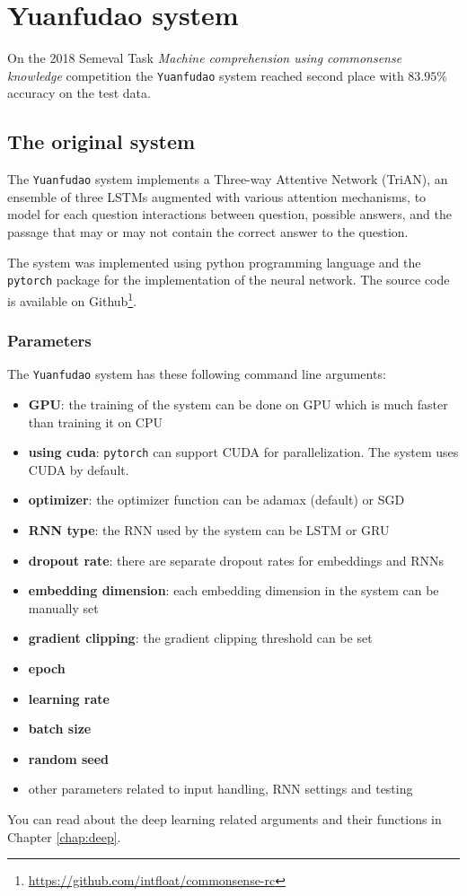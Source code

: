 \chapter{Yuanfudao system}
\label{chap:yuanfudao}
On the 2018 Semeval Task \textit{Machine comprehension using commonsense knowledge} competition the \texttt{Yuanfudao} \cite{Wang:2018} system reached second place with $83.95\%$ accuracy on the test data.

\section{The original system}

The \texttt{Yuanfudao} system implements a Three-way Attentive Network (TriAN), an ensemble of three LSTMs augmented with various attention mechanisms, to model for each question interactions between question, possible answers, and the passage that may or may not contain the correct answer to the question.

The system was implemented using python programming language and the \texttt{pytorch} package for the implementation of the neural network. The source code is available on Github\footnote{\url{https://github.com/intfloat/commonsense-rc}}.

\subsection{Parameters}

The \texttt{Yuanfudao} system has these following command line arguments:
\begin{itemize}
	\item \textbf{GPU}: the training of the system can be done on GPU which is much faster than training it on CPU
	\item \textbf{using cuda}: \texttt{pytorch} can support CUDA for parallelization. The system uses CUDA by default.
	\item \textbf{optimizer}: the optimizer function can be adamax (default) or SGD
	\item \textbf{RNN type}: the RNN used by the system can be LSTM or GRU
	\item \textbf{dropout rate}: there are separate dropout rates for embeddings and RNNs
	\item \textbf{embedding dimension}: each embedding dimension in the system can be manually set
	\item \textbf{gradient clipping}: the gradient clipping threshold can be set
	\item \textbf{epoch}
	\item \textbf{learning rate}
	\item \textbf{batch size}
	\item \textbf{random seed}
	\item other parameters related to input handling, RNN settings and testing
\end{itemize}
You can read about the deep learning related arguments and their functions in Chapter \ref{chap:deep}.

